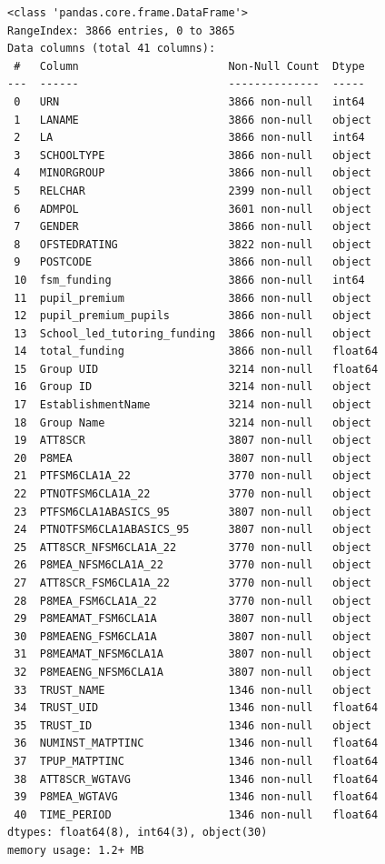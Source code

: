 \documentclass[
  letterpaper,
  DIV=11,
  numbers=noendperiod]{scrartcl}
\begin{document}
\begin{verbatim}
<class 'pandas.core.frame.DataFrame'>
RangeIndex: 3866 entries, 0 to 3865
Data columns (total 41 columns):
 #   Column                       Non-Null Count  Dtype  
---  ------                       --------------  -----  
 0   URN                          3866 non-null   int64  
 1   LANAME                       3866 non-null   object 
 2   LA                           3866 non-null   int64  
 3   SCHOOLTYPE                   3866 non-null   object 
 4   MINORGROUP                   3866 non-null   object 
 5   RELCHAR                      2399 non-null   object 
 6   ADMPOL                       3601 non-null   object 
 7   GENDER                       3866 non-null   object 
 8   OFSTEDRATING                 3822 non-null   object 
 9   POSTCODE                     3866 non-null   object 
 10  fsm_funding                  3866 non-null   int64  
 11  pupil_premium                3866 non-null   object 
 12  pupil_premium_pupils         3866 non-null   object 
 13  School_led_tutoring_funding  3866 non-null   object 
 14  total_funding                3866 non-null   float64
 15  Group UID                    3214 non-null   float64
 16  Group ID                     3214 non-null   object 
 17  EstablishmentName            3214 non-null   object 
 18  Group Name                   3214 non-null   object 
 19  ATT8SCR                      3807 non-null   object 
 20  P8MEA                        3807 non-null   object 
 21  PTFSM6CLA1A_22               3770 non-null   object 
 22  PTNOTFSM6CLA1A_22            3770 non-null   object 
 23  PTFSM6CLA1ABASICS_95         3807 non-null   object 
 24  PTNOTFSM6CLA1ABASICS_95      3807 non-null   object 
 25  ATT8SCR_NFSM6CLA1A_22        3770 non-null   object 
 26  P8MEA_NFSM6CLA1A_22          3770 non-null   object 
 27  ATT8SCR_FSM6CLA1A_22         3770 non-null   object 
 28  P8MEA_FSM6CLA1A_22           3770 non-null   object 
 29  P8MEAMAT_FSM6CLA1A           3807 non-null   object 
 30  P8MEAENG_FSM6CLA1A           3807 non-null   object 
 31  P8MEAMAT_NFSM6CLA1A          3807 non-null   object 
 32  P8MEAENG_NFSM6CLA1A          3807 non-null   object 
 33  TRUST_NAME                   1346 non-null   object 
 34  TRUST_UID                    1346 non-null   float64
 35  TRUST_ID                     1346 non-null   object 
 36  NUMINST_MATPTINC             1346 non-null   float64
 37  TPUP_MATPTINC                1346 non-null   float64
 38  ATT8SCR_WGTAVG               1346 non-null   float64
 39  P8MEA_WGTAVG                 1346 non-null   float64
 40  TIME_PERIOD                  1346 non-null   float64
dtypes: float64(8), int64(3), object(30)
memory usage: 1.2+ MB
\end{verbatim}
\end{document}
